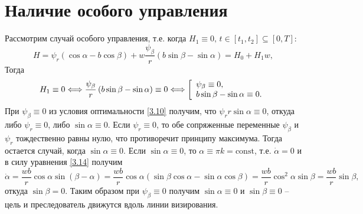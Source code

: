 \documentclass[a4paper,12pt, openany]{book}
\theoremstyle{plain} %
\theoremstyle{definition} %
\theoremstyle{remark} %
\numberwithin{equation}{chapter}
\begin{document}
{\section{Наличие особого управления} Рассмотрим случай особого управления, т.е. когда $H_1 \equiv 0,\, t\in [t_1,t_2] \subseteq [0,T]$:
\begin{equation}\label{3.15}
H = \psi _r \left( {\cos \alpha  - b\cos \beta } \right) + w\frac{{\psi _\beta  }}{r}\left( {b\sin \beta  - \sin \alpha } \right) = H_0  + H_1 w,
\end{equation}
Тогда
\[
H_1  \equiv 0 \Longleftrightarrow \frac{{\psi _\beta  }}{r}\left( {b\sin \beta  - \sin \alpha } \right) \equiv 0 \Longleftrightarrow \left[ {\begin{array}{*{20}l}
   {\psi _\beta   \equiv 0,}  \\
   {b\sin \beta  - \sin \alpha  \equiv 0.}  \\
\end{array}} \right.
\]
При $\psi_\beta \equiv 0$ из условия оптимальности \eqref{3.10} получим, что $\psi_r r\sin\alpha \equiv 0$, откуда либо $\psi_r \equiv 0$, либо $\sin\alpha \equiv 0$. Если $\psi_r \equiv 0$, то обе сопряженные переменные $\psi_\beta$ и $\psi_r$ тождественно равны нулю, что противоречит принципу максимума. Тогда остается случай, когда $\sin\alpha \equiv 0$. Если $\sin\alpha \equiv 0$, то $\alpha \equiv \pi k = \mathrm{const}$, т.е. $\dot\alpha = 0$ и в силу уравнения \eqref{3.14} получим
\[
\dot \alpha  = \frac{{wb}}{r}\cos \alpha \sin \left( {\beta  - \alpha } \right) = \frac{{wb}}{r}\cos \alpha \left( {\sin \beta \cos \alpha  - \sin \alpha \cos \beta } \right) = \frac{{wb}}{r}\cos ^2 \alpha \sin \beta  = \frac{{wb}}{r}\sin \beta,
\]
откуда $\sin\beta = 0$. Таким образом при $\psi_\beta \equiv 0$ получим $\sin\alpha \equiv 0$ и $\sin\beta \equiv 0$ -- цель и преследователь движутся вдоль линии визирования.

}
\end{document}
